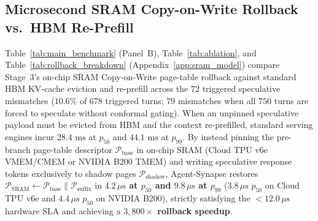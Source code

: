 \documentclass[10pt,conference]{IEEEtran}
\begin{document}
\subsection{Microsecond SRAM Copy-on-Write Rollback vs.\ HBM Re-Prefill}
Table~\ref{tab:main_benchmark} (Panel~B), Table~\ref{tab:ablation}, and Table~\ref{tab:rollback_breakdown} (Appendix~\ref{app:sram_model}) compare Stage~3's on-chip SRAM Copy-on-Write page-table rollback against standard HBM KV-cache eviction and re-prefill across the $72$ triggered speculative mismatches ($10.6\%$ of $678$ triggered turns; $79$ mismatches when all $750$ turns are forced to speculate without conformal gating). When an unpinned speculative payload must be evicted from HBM and the context re-prefilled, standard serving engines incur $28.4\text{ ms}$ at $p_{50}$ and $44.1\text{ ms}$ at $p_{99}$. By instead pinning the pre-branch page-table descriptor $\mathcal{P}_{\text{base}}$ in on-chip SRAM (Cloud TPU v6e VMEM/CMEM or NVIDIA B200 TMEM) and writing speculative response tokens exclusively to shadow pages $\mathcal{P}_{\text{shadow}}$, Agent-Synapse restores $\mathcal{P}_{\text{SRAM}} \leftarrow \mathcal{P}_{\text{base}} \parallel \mathcal{P}_{\text{suffix}}$ in \textbf{$4.2\,\mu\text{s}$ at $p_{50}$ and $9.8\,\mu\text{s}$ at $p_{99}$} ($3.8\,\mu\text{s}$ $p_{50}$ on Cloud TPU v6e and $4.4\,\mu\text{s}$ $p_{50}$ on NVIDIA B200), strictly satisfying the $< 12.0\,\mu\text{s}$ hardware SLA and achieving a \textbf{$3{,}800\times$ rollback speedup}.
\end{document}
